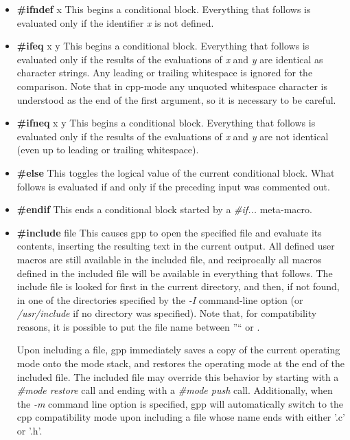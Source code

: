\begin{itemize}
\item {\bf \#ifndef }x\htmlBR
This begins a conditional block. Everything that follows is evaluated only if
the identifier {\it x} is not defined. 

\item {\bf \#ifeq }x y\htmlBR
This begins a conditional block. Everything that follows is evaluated only if
the results of the evaluations of {\it x} and {\it y} are identical as
character strings. Any leading or trailing whitespace is ignored for the
comparison. Note that in cpp-mode any unquoted whitespace character is
understood as the end of the first argument, so it is necessary to be careful.


\item {\bf \#ifneq }x y\htmlBR
This begins a conditional block. Everything that follows is evaluated only if
the results of the evaluations of {\it x} and {\it y} are not identical (even
up to leading or trailing whitespace). 

\item {\bf \#else}\htmlBR
This toggles the logical value of the current conditional block. What follows
is evaluated if and only if the preceding input was commented out. 

\item {\bf \#endif}\htmlBR
This ends a conditional block started by a {\it \#if...} meta-macro. 

\item {\bf \#include }file\htmlBR
This causes gpp to open the specified file and evaluate its contents,
inserting the resulting text in the current output. All defined user macros
are still available in the included file, and reciprocally all macros defined
in the included file will be available in everything that follows. The include
file is looked for first in the current directory, and then, if not found, in
one of the directories specified by the {\it -I} command-line option (or {\it
/usr/include} if no directory was specified). Note that, for compatibility
reasons, it is possible to put the file name between ''`` or
{\htmlLt}{\htmlGt}. 

Upon including a file, gpp immediately saves a copy of the current operating
mode onto the mode stack, and restores the operating mode at the end of the
included file. The included file may override this behavior by starting with a
{\it \#mode restore} call and ending with a {\it \#mode push} call.
Additionally, when the {\it -m} command line option is specified, gpp will
automatically switch to the cpp compatibility mode upon including a file whose
name ends with either '.c' or '.h'. 


\end{itemize}
